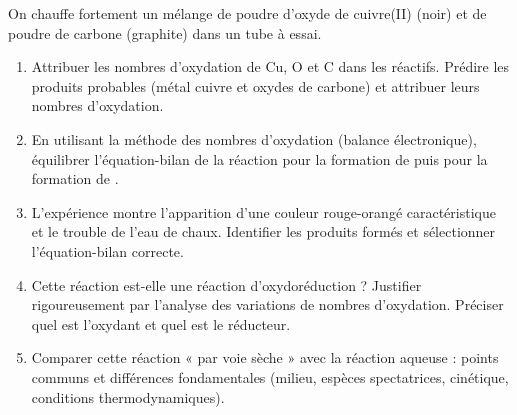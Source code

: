 \documentclass[11pt]{article}
\begin{document}
\begin{exercice}
On chauffe fortement un mélange de poudre d'oxyde de cuivre(II)  (noir) et de poudre de carbone  (graphite) dans un tube à essai.
\begin{enumerate}
    \item Attribuer les nombres d'oxydation de Cu, O et C dans les réactifs. Prédire les produits probables (métal cuivre et oxydes de carbone) et attribuer leurs nombres d'oxydation.
    \item En utilisant la méthode des nombres d'oxydation (balance électronique), équilibrer l'équation-bilan de la réaction pour la formation de  puis pour la formation de .
    \item L'expérience montre l'apparition d'une couleur rouge-orangé caractéristique et le trouble de l'eau de chaux. Identifier les produits formés et sélectionner l'équation-bilan correcte.
    \item Cette réaction est-elle une réaction d'oxydoréduction ? Justifier rigoureusement par l'analyse des variations de nombres d'oxydation. Préciser quel est l'oxydant et quel est le réducteur.
    \item Comparer cette réaction « par voie sèche » avec la réaction aqueuse  : points communs et différences fondamentales (milieu, espèces spectatrices, cinétique, conditions thermodynamiques).
\end{enumerate}
\end{exercice}
\end{document}
